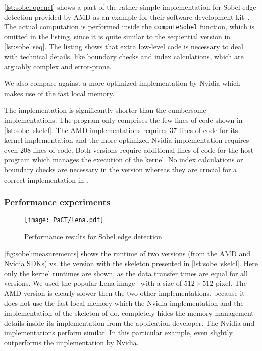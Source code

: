 \autoref{lst:sobel:opencl} shows a part of the rather simple \OpenCL implementation for Sobel edge detection provided by AMD as an example for their software development kit~\cite{AMDSDK}.
The actual computation is performed inside the \texttt{computeSobel} function, which is omitted in the listing, since it is quite similar to the sequential version in \autoref{lst:sobel:seq}.
The listing shows that extra low-level code is necessary to deal with technical details, like boundary checks and index calculations, which are arguably complex and error-prone.

We also compare against a more optimized \OpenCL implementation by Nvidia which makes use of the fast local \GPU memory.

The \SkelCL implementation is significantly shorter than the cumbersome \OpenCL implementations.
The \SkelCL program only comprises the few lines of code shown in \autoref{lst:sobel:skelcl}.
The AMD implementations requires 37 lines of code for its kernel implementation and the more optimized Nvidia implementation requires even 208 lines of code.
Both versions require additional lines of code for the host program which manages the execution of the \OpenCL kernel.
No index calculations or boundary checks are necessary in the \SkelCL version whereas they are crucial for a correct implementation in \OpenCL.

\subsubsection*{Performance experiments}

\begin{figure}[tbp]
  \vspace{.5em}
  \centering
  \texttt{[image: PaCT/lena.pdf]}
  \caption{Performance results for Sobel edge detection}
  \label{fig:sobel:measurements}
\end{figure}
\autoref{fig:sobel:measurements} shows the runtime of two \OpenCL versions (from the AMD and Nvidia SDKs) vs. the \SkelCL version with the \stencil skeleton presented in \autoref{lst:sobel:skelcl}.
Here only the kernel runtimes are shown, as the data transfer times are equal for all versions.
We used the popular Lena image~\cite{Lena} with a size of $512\times 512$ pixel.
The AMD version is clearly slower then the two other implementations, because it does not use the fast local memory which the Nvidia implementation and the  implementation of the \stencil skeleton of \SkelCL do.
\SkelCL completely hides the memory management details inside its implementation from the application developer.
The Nvidia and \SkelCL implementations perform similar.
In this particular example, \SkelCL even slightly outperforms the implementation by Nvidia.










